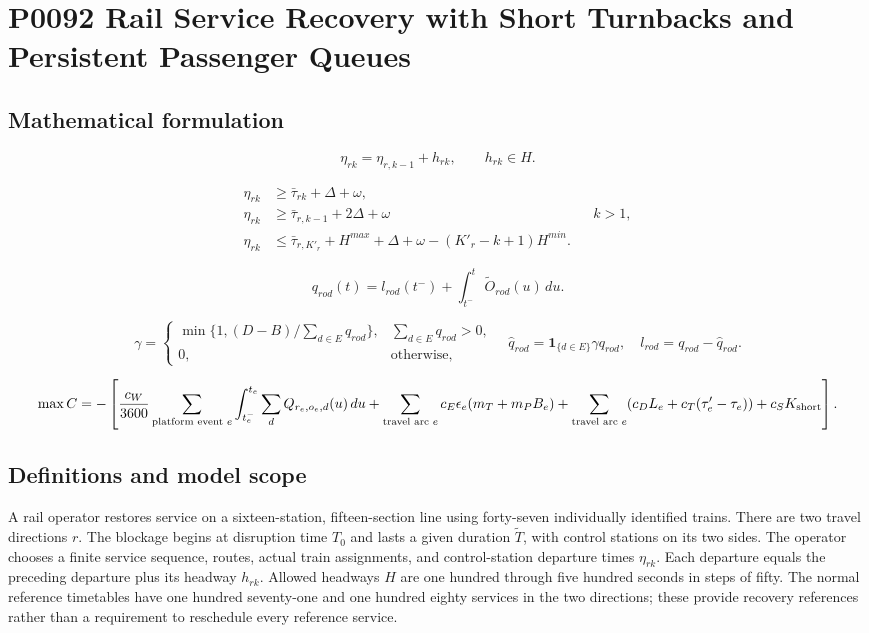 \documentclass[10pt]{article}
\begin{document}
\section*{P0092 Rail Service Recovery with Short Turnbacks and Persistent Passenger Queues}
\subsection*{Mathematical formulation}
\[
\eta_{rk}=\eta_{r,k-1}+h_{rk},\qquad h_{rk}\in H.
\]

\begin{align*}
\eta_{rk}&\ge\bar\tau_{rk}+\Delta+\omega,\\
\eta_{rk}&\ge\bar\tau_{r,k-1}+2\Delta+\omega &&k>1,\\
\eta_{rk}&\le\bar\tau_{r,K'_r}+H^{max}+\Delta+\omega
 -(K'_r-k+1)H^{min}.
\end{align*}

\[
q_{rod}(t)=l_{rod}(t^-)+\int_{t^-}^{t}\widetilde O_{rod}(u)\,du .
\]

\[
\gamma=\begin{cases}
\min\{1,(D-B)/\sum_{d\in E}q_{rod}\},&\sum_{d\in E}q_{rod}>0,\\
0,&\text{otherwise},
\end{cases}\quad
\widehat q_{rod}=\mathbf1_{\{d\in E\}}\gamma q_{rod},\quad
l_{rod}=q_{rod}-\widehat q_{rod}.
\]

\[
\max C=-\left[
\frac{c_W}{3600}\sum_{\text{platform event }e}\int_{t_e^-}^{t_e}
\sum_d Q_{r_e,o_e,d}(u)\,du
+\sum_{\text{travel arc }e}c_E\epsilon_e(m_T+m_PB_e)
+\sum_{\text{travel arc }e}(c_D L_e+c_T(\tau'_e-\tau_e))
+c_S K_{\rm short}\right].
\]

\subsection*{Definitions and model scope}
A rail operator restores service on a sixteen-station, fifteen-section line using forty-seven individually identified trains. There are two travel directions $r$. The blockage begins at disruption time $T_0$ and lasts a given duration $\widetilde T$, with control stations on its two sides. The operator chooses a finite service sequence, routes, actual train assignments, and control-station departure times $\eta_{rk}$. Each departure equals the preceding departure plus its headway $h_{rk}$. Allowed headways $H$ are one hundred through five hundred seconds in steps of fifty. The normal reference timetables have one hundred seventy-one and one hundred eighty services in the two directions; these provide recovery references rather than a requirement to reschedule every reference service.
\end{document}

